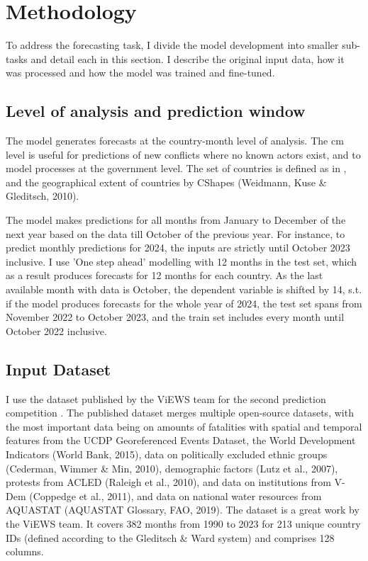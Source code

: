 \documentclass[runningheads]{llncs}
\begin{document}
    \section{Methodology}
    To address the forecasting task, I divide the model development into smaller sub-tasks and detail each in this section. I describe the original input data, how it was processed and how the model was trained and fine-tuned.

    \subsection{Level of analysis and prediction window}
    \label{method_pred_wind}
    The model generates forecasts at the country-month level of analysis. The cm level is useful for predictions of new conflicts where no known actors exist, and to model processes at the government level. The set of countries is defined as in \cite{GleditschWard}, and the geographical extent of countries by CShapes (Weidmann, Kuse \& Gleditsch, 2010).

    The model makes predictions for all months from January to December of the next year based on the data till October of the previous year. For instance, to predict monthly predictions for 2024, the inputs are strictly until October 2023 inclusive. I use 'One step ahead' modelling with 12 months in the test set, which as a result produces forecasts for 12 months for each country. As the last available month with data is October, the dependent variable is shifted by 14, s.t. if the model produces forecasts for the whole year of 2024, the test set spans from November 2022 to October 2023, and the train set includes every month until October 2022 inclusive.

    \subsection{Input Dataset}
    \label{section_input_data}
    I use the dataset published by the ViEWS team for the second prediction competition \cite{predictionchallenge2023}. The published dataset merges multiple open-source datasets, with the most important data being on amounts of fatalities with spatial and temporal features from the UCDP Georeferenced Events Dataset, the World Development Indicators (World Bank, 2015), data on politically excluded ethnic groups (Cederman, Wimmer \& Min, 2010), demographic factors (Lutz et al., 2007), protests from ACLED (Raleigh et al., 2010), and data on institutions from V-Dem (Coppedge et al., 2011), and data on national water resources from AQUASTAT (AQUASTAT Glossary, FAO, 2019). The dataset is a great work by the ViEWS team. It covers 382 months from 1990 to 2023 for 213 unique country IDs (defined according to the Gleditsch \& Ward system) and comprises 128 columns.
\end{document}

